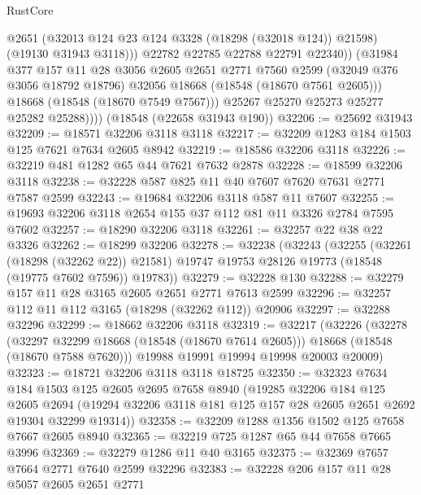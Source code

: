 \begin{lexlean}{RustCore}
\begin{coremodule}
                      @2651
                      (@32013 @124 @23 @124 @3328 (@18298 (@32018 @124)) @21598)
                      (@19130 @31943 @3118)))
                  @22782
                  @22785
                  @22788
                  @22791
                  @22340))
              (@31984
                @377
                @157
                @11
                @28
                @3056
                @2605
                @2651
                @2771
                @7560
                @2599
                (@32049 @376 @3056 @18792 @18796)
                @32056
                @18668
                (@18548 (@18670 @7561 @2605)))
              @18668
              (@18548 (@18670 @7549 @7567)))
            @25267
            @25270
            @25273
            @25277
            @25282
            @25288))))
    (@18548 (@22658 @31943 @190))
@32206 := @25692 @31943
@32209 := @18571 @32206 @3118 @3118
@32217 := @32209 @1283 @184 @1503 @125 @7621 @7634 @2605 @8942
@32219 := @18586 @32206 @3118
@32226 := @32219 @481 @1282 @65 @44 @7621 @7632 @2878
@32228 := @18599 @32206 @3118
@32238 := @32228 @587 @825 @11 @40 @7607 @7620 @7631 @2771 @7587 @2599
@32243 := @19684 @32206 @3118 @587 @11 @7607
@32255 := @19693 @32206 @3118 @2654 @155 @37 @112 @81 @11 @3326 @2784 @7595 @7602
@32257 := @18290 @32206 @3118
@32261 := @32257 @22 @38 @22 @3326
@32262 := @18299 @32206
@32278 := @32238
    (@32243
      (@32255
        (@32261 (@18298 (@32262 @22)) @21581)
        @19747
        @19753
        @28126
        @19773
        (@18548 (@19775 @7602 @7596))
        @19783))
@32279 := @32228 @130
@32288 := @32279 @157 @11 @28 @3165 @2605 @2651 @2771 @7613 @2599
@32296 := @32257 @112 @11 @112 @3165 (@18298 (@32262 @112)) @20906
@32297 := @32288 @32296
@32299 := @18662 @32206 @3118
@32319 := @32217
    (@32226
      (@32278
        (@32297 @32299 @18668 (@18548 (@18670 @7614 @2605)))
        @18668
        (@18548 (@18670 @7588 @7620)))
      @19988
      @19991
      @19994
      @19998
      @20003
      @20009)
@32323 := @18721 @32206 @3118 @3118 @18725
@32350 := @32323
    @7634
    @184
    @1503
    @125
    @2605
    @2695
    @7658
    @8940
    (@19285
      @32206
      @184
      @125
      @2605
      @2694
      (@19294 @32206 @3118 @181 @125 @157 @28 @2605 @2651 @2692 @19304 @32299 @19314))
@32358 := @32209 @1288 @1356 @1502 @125 @7658 @7667 @2605 @8940
@32365 := @32219 @725 @1287 @65 @44 @7658 @7665 @3996
@32369 := @32279 @1286 @11 @40 @3165
@32375 := @32369 @7657 @7664 @2771 @7640 @2599 @32296
@32383 := @32228 @206 @157 @11 @28 @5057 @2605 @2651 @2771

\end{coremodule}
\end{lexlean}
